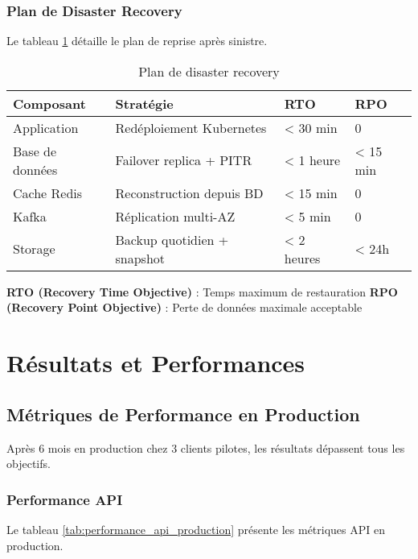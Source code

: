 \subsubsection{Plan de Disaster Recovery}

Le tableau \ref{tab:disaster_recovery} détaille le plan de reprise après sinistre.

\begin{table}[htpb]
\centering
\caption{Plan de disaster recovery}
\label{tab:disaster_recovery}
\begin{tabular}{|p{}|p{}|p{}|p{}|}
\hline
\textbf{Composant} & \textbf{Stratégie} & \textbf{RTO} & \textbf{RPO} \\
\hline
Application & Redéploiement Kubernetes & < 30 min & 0 \\
\hline
Base de données & Failover replica + PITR & < 1 heure & < 15 min \\
\hline
Cache Redis & Reconstruction depuis BD & < 15 min & 0 \\
\hline
Kafka & Réplication multi-AZ & < 5 min & 0 \\
\hline
Storage & Backup quotidien + snapshot & < 2 heures & < 24h \\
\hline
\end{tabular}
\end{table}

\textbf{RTO (Recovery Time Objective)} : Temps maximum de restauration  
\textbf{RPO (Recovery Point Objective)} : Perte de données maximale acceptable

\section{Résultats et Performances}

\subsection{Métriques de Performance en Production}

Après 6 mois en production chez 3 clients pilotes, les résultats dépassent tous les objectifs.

\subsubsection{Performance API}

Le tableau \ref{tab:performance_api_production} présente les métriques API en production.

